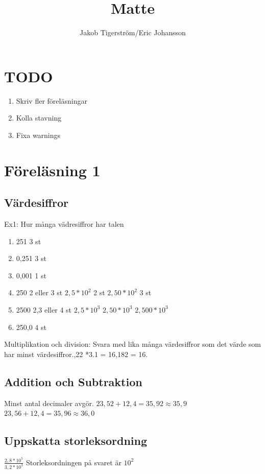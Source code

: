 \documentclass[a4paper,11pt]{article}
\title{Matte}
\author{Jakob Tigerström/Eric Johansson}
\begin{document}
\maketitle
\tableofcontents
\newpage
\begin{flushleft}
\section{TODO}
\begin{enumerate}
  \item Skriv fler föreläsningar
  \item Kolla stavning
  \item Fixa warnings
\end{enumerate}
\section{Föreläsning 1}
\subsection{Värdesiffror}
Ex1: Hur många vädresiffror har talen
\begin{enumerate}
  \item 251 3 st
  \item 0,251 3 st
  \item 0,001 1 st
  \item 250 2 eller 3 st\newline
$ 2,5*10^2 $ 2 st\newline
$ 2,50*10^2 $ 3 st
  \item 2500 2,3 eller 4 st
$ 2,5*10^3 $\newline
$ 2,50*10^3 $\newline
$ 2,500*10^3 $
  \item 250,0 4 st
\end{enumerate}
Multiplikation och division: Svara med lika många värdesiffror som det värde som har minst värdesiffror.,22 *3.1 = 16,182 = 16.
\subsection{Addition och Subtraktion}
Minst antal decimaler avgör.\newline
$ 23,52 + 12,4 = 35,92  \approx 35,9 $\newline
$ 23,56 + 12,4 = 35,96  \approx 36,0 $
\subsection{Uppskatta storleksordning}
$ \frac{2,8*10^5}{3,2*10^3} $\newline
Storleksordningen på svaret är $ 10^2 $

\end{flushleft}
\end{document}
